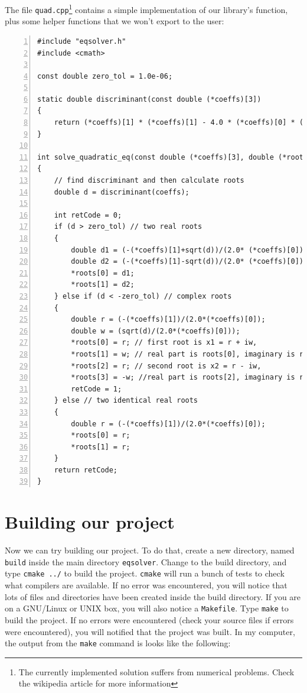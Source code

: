 \documentclass[12pt,a4paper]{article}
\begin{document}
The file \verb+quad.cpp+\footnote{The currently implemented solution suffers from numerical problems. Check the wikipedia article for more information} contains a simple implementation of our library's function, plus some helper
functions that we won't export to the user:
\begin{lstlisting}[basicstyle=\small, numbers=left,caption=quad.cpp,columns=flexible,keywordstyle=\color{black}\ttfamily]
#include "eqsolver.h"
#include <cmath>

const double zero_tol = 1.0e-06;

static double discriminant(const double (*coeffs)[3])
{
	return (*coeffs)[1] * (*coeffs)[1] - 4.0 * (*coeffs)[0] * (*coeffs)[2];
}

int solve_quadratic_eq(const double (*coeffs)[3], double (*roots)[4])
{
	// find discriminant and then calculate roots
	double d = discriminant(coeffs);
	
	int retCode = 0;
	if (d > zero_tol) // two real roots
	{
		double d1 = (-(*coeffs)[1]+sqrt(d))/(2.0* (*coeffs)[0]);
		double d2 = (-(*coeffs)[1]-sqrt(d))/(2.0* (*coeffs)[0]);
		*roots[0] = d1;
		*roots[1] = d2;
	} else if (d < -zero_tol) // complex roots
	{
		double r = (-(*coeffs)[1])/(2.0*(*coeffs)[0]);
		double w = (sqrt(d)/(2.0*(*coeffs)[0]));
		*roots[0] = r; // first root is x1 = r + iw,
		*roots[1] = w; // real part is roots[0], imaginary is roots[1]]
		*roots[2] = r; // second root is x2 = r - iw,
		*roots[3] = -w; //real part is roots[2], imaginary is roots[2]
		retCode = 1;
	} else // two identical real roots
	{
		double r = (-(*coeffs)[1])/(2.0*(*coeffs)[0]);
		*roots[0] = r;
		*roots[1] = r;
	} 
	return retCode;
}
\end{lstlisting}
\section{Building our project}
Now we can try building our project. To do that, create a new directory, named \verb+build+ inside the main directory \verb+eqsolver+. Change to the build directory, and type \verb+cmake ../+ to build the project. \verb+cmake+ will run a bunch of tests to check what compilers are available. If no error was encountered, you will notice that lots of files and directories have been created inside the build directory. If you are on a GNU/Linux or UNIX box, you will also notice a \verb+Makefile+. Type \verb+make+ to build the project. If no errors were encountered (check your source files if errors were encountered), you will notified that the project was built. In my computer, the output from the \verb+make+ command is looks like the following:
\end{document}
